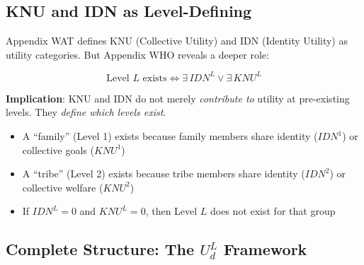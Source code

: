 \subsection{KNU and IDN as Level-Defining}

\begin{tcolorbox}[colback=yellow!5!white, colframe=yellow!75!black, 
    title=Critical Connection: KNU/IDN Define Levels (AAA Axiom SRL-2)]
Appendix WAT defines KNU (Collective Utility) and IDN (Identity Utility) as 
utility categories. But Appendix WHO reveals a deeper role:

\begin{equation}
\boxed{\text{Level } L \text{ exists} \iff \exists \, IDN^L \lor \exists \, KNU^L}
\end{equation}

\textbf{Implication}: KNU and IDN do not merely \textit{contribute to} utility at 
pre-existing levels. They \textit{define which levels exist}.

\begin{itemize}[nosep]
\item A ``family'' (Level 1) exists because family members share identity ($IDN^1$) 
      or collective goals ($KNU^1$)
\item A ``tribe'' (Level 2) exists because tribe members share identity ($IDN^2$) 
      or collective welfare ($KNU^2$)
\item If $IDN^L = 0$ and $KNU^L = 0$, then Level $L$ does not exist for that group
\end{itemize}
\end{tcolorbox}

\subsection{Complete Structure: The $U^L_d$ Framework}

